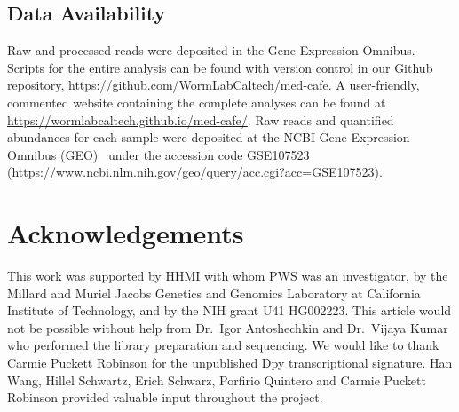 \documentclass[8pt, twocolumn]{article}
\begin{document}
\subsection*{Data Availability}
Raw and processed reads were deposited in the Gene Expression Omnibus. Scripts
for the entire analysis can be found with version control in our Github
repository, \url{https://github.com/WormLabCaltech/med-cafe}. A user-friendly,
commented website containing the complete analyses can be found at
\url{https://wormlabcaltech.github.io/med-cafe/}. Raw reads and quantified
abundances for each sample were deposited at the NCBI Gene Expression Omnibus
(GEO)~\cite{Edgar2002} under the accession code GSE107523
(\url{https://www.ncbi.nlm.nih.gov/geo/query/acc.cgi?acc=GSE107523}).

\section*{Acknowledgements}
This work was supported by HHMI with whom PWS was an investigator, by the
Millard and Muriel Jacobs Genetics and Genomics Laboratory at California
Institute of Technology, and by the NIH grant U41 HG002223. This article
would not be possible without help from Dr.\ Igor Antoshechkin and Dr.\ Vijaya
Kumar who performed the library preparation and sequencing.
We would like to
thank Carmie Puckett Robinson for the unpublished Dpy transcriptional
signature.
Han Wang, Hillel Schwartz, Erich Schwarz, Porfirio Quintero and
Carmie Puckett Robinson provided valuable input throughout the project.



\end{document}
